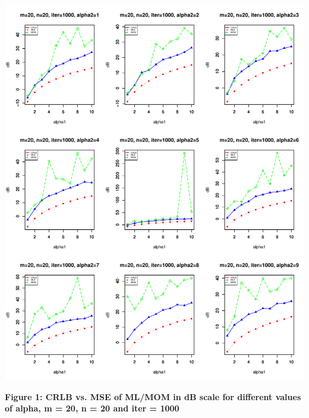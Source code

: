 \documentclass{article} %
\newcommand{\?}{\stackrel{?}{=}}
\begin{document}
\newpage

\includegraphics[scale=0.8]{plt_n20_m20_ik2.pdf}
\begin{center}
\textbf{Figure 1: CRLB vs. MSE of ML/MOM in dB scale for different values of alpha, m = 20, n = 20 and iter = 1000}
\end{center}
\end{document}
